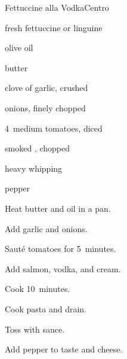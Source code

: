 \begin{recipe}{Fettuccine alla Vodka}{Centro}{}

\begin{ingredients}
\item {} fresh fettuccine or linguine
\item {} olive oil
\item {} butter
\item clove of garlic, crushed
\item {} onions, finely chopped
\item 4~medium tomatoes, diced
\item {} smoked , chopped
\item {} 
\item {} heavy whipping 
\item pepper
\item \C{\quarter} 
\end{ingredients}

\begin{directions}
\item Heat butter and oil in a pan.
\item Add garlic and onions.
\item Saut\'e tomatoes for 5~minutes.
\item Add salmon, vodka, and cream.
\item Cook 10~minutes.
\item Cook pasta and drain.
\item Toss with sauce.
\item Add pepper to taste and cheese.
\end{directions}

\end{recipe}
